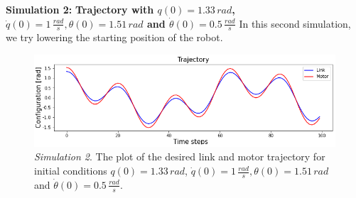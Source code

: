\documentclass[a4paper]{article}
\begin{document}
\textbf{Simulation 2:} \textbf{Trajectory with $q(0)=1.33\, rad$, $\dot{q}(0)=1\, \frac{rad}{s}, \theta(0)=1.51\, rad$ and $\dot{\theta}(0)=0.5\, \frac{rad}{s}$}
In this second simulation, we try lowering the starting position of the robot.

\begin{figure}
    \centering
    \includegraphics[scale=0.7]{img/final_results/elastic/300_2/76l_87m/traj_76_87.png}
    \caption{\textit{Simulation 2}. The plot of the desired link and motor trajectory for initial conditions $q(0)=1.33\, rad$, $\dot{q}(0)=1\, \frac{rad}{s}, \theta(0)=1.51\, rad$ and $\dot{\theta}(0)=0.5\, \frac{rad}{s}.$}
    \label{fig:desired_elastic_76_87}
\end{figure}
\end{document}
